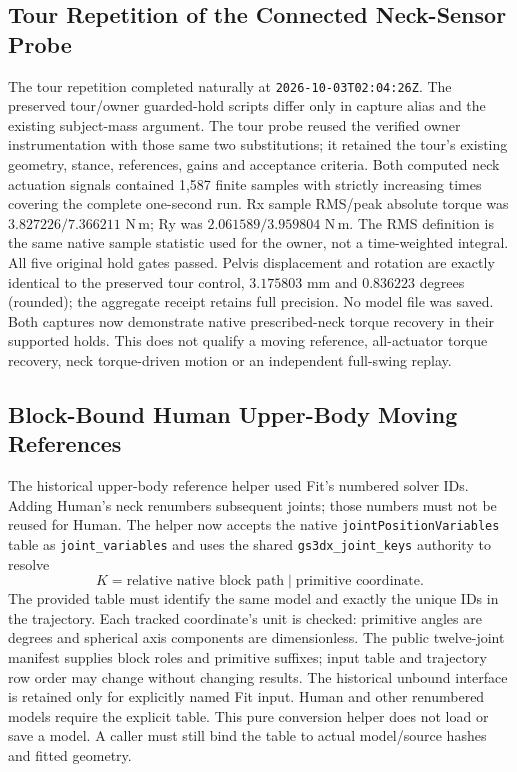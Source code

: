 \documentclass[11pt,a4paper]{article}
\begin{document}
\subsection{Tour Repetition of the Connected Neck-Sensor Probe}
The tour repetition completed naturally at \texttt{2026-10-03T02:04:26Z}.
The preserved tour/owner guarded-hold scripts differ only in capture alias
and the existing subject-mass argument. The tour probe reused the verified
owner instrumentation with those same two substitutions; it retained the
tour's existing geometry, stance, references, gains and acceptance criteria.
Both computed neck actuation signals contained 1,587 finite samples with
strictly increasing times covering the complete one-second run.
Rx sample RMS/peak absolute torque was $3.827226/7.366211$ N\,m;
Ry was $2.061589/3.959804$ N\,m. The RMS definition is the same native
sample statistic used for the owner, not a time-weighted integral.
All five original hold gates passed. Pelvis displacement and rotation are
exactly identical to the preserved tour control, $3.175803$ mm and
$0.836223$ degrees (rounded); the aggregate receipt retains full precision.
No model file was saved. Both captures now demonstrate native prescribed-neck
torque recovery in their supported holds. This does not qualify a moving
reference, all-actuator torque recovery, neck torque-driven motion or an
independent full-swing replay.


\subsection{Block-Bound Human Upper-Body Moving References}
The historical upper-body reference helper used Fit's numbered solver IDs.
Adding Human's neck renumbers subsequent joints; those numbers must not be
reused for Human. The helper now accepts the native
\texttt{jointPositionVariables} table as \texttt{joint\_variables} and
uses the shared \texttt{gs3dx\_joint\_keys} authority to resolve
\[
 K=\text{relative native block path}\;|\;\text{primitive coordinate}.
\]
The provided table must identify the same model and exactly the unique IDs
in the trajectory. Each tracked coordinate's unit is checked: primitive
angles are degrees and spherical axis components are dimensionless.
The public twelve-joint manifest supplies block roles and primitive suffixes;
input table and trajectory row order may change without changing results.
The historical unbound interface is retained only for explicitly named Fit
input. Human and other renumbered models require the explicit table.
This pure conversion helper does not load or save a model. A caller must
still bind the table to actual model/source hashes and fitted geometry.
\end{document}
